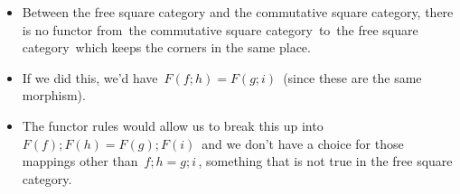 
\begin{itemize}
    \item  Between the free square category and the commutative square category, there is no functor from \,the commutative square category\, to \,the free square category\, which keeps the corners in the same place.
    \item If we did this, we'd have \,$F(f;h)=F(g;i)$\, (since these are the same morphism).
    \item The functor rules would allow us to break this up into \,$F(f);F(h)=F(g);F(i)$\, and we don't have a choice for those mappings other than \,$f;h=g;i$\,, something that is not true in the free square category.
  \end{itemize}
